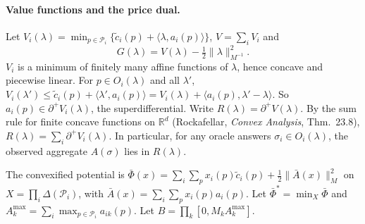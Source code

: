 \documentclass[11pt]{article}
\theoremstyle{definition}
\theoremstyle{remark}
\newcommand{\R}{\mathbb{R}}
\newcommand{\cP}{\mathcal{P}}
\newcommand{\ip}[2]{\langle #1,#2\rangle}
\newcommand{\Abar}{\bar A}
\newcommand{\Amax}{A^{\max}}
\newcommand{\sd}{\partial^{+}}
\begin{document}
\paragraph{Value functions and the price dual.} Let $V_i(\lambda)=\min_{p\in\cP_i}\{\tilde c_i(p)+\ip{\lambda}{a_i(p)}\}$, $V=\sum_iV_i$ and
\[G(\lambda)=V(\lambda)-\tfrac12\|\lambda\|^2_{M^{-1}}.\]
$V_i$ is a minimum of finitely many affine functions of $\lambda$, hence concave and piecewise linear. For $p\in O_i(\lambda)$ and all $\lambda'$, $V_i(\lambda')\le\tilde c_i(p)+\ip{\lambda'}{a_i(p)}=V_i(\lambda)+\ip{a_i(p)}{\lambda'-\lambda}$. So $a_i(p)\in\sd V_i(\lambda)$, the superdifferential. Write $R(\lambda)=\sd V(\lambda)$. By the sum rule for finite concave functions on $\R^d$ (Rockafellar, \emph{Convex Analysis}, Thm.~23.8), $R(\lambda)=\sum_i\sd V_i(\lambda)$. In particular, for any oracle answers $\sigma_i\in O_i(\lambda)$, the observed aggregate $A(\sigma)$ lies in $R(\lambda)$.

The convexified potential is $\bar\Phi(x)=\sum_i\sum_px_i(p)\tilde c_i(p)+\tfrac12\|\Abar(x)\|_M^2$ on $X=\prod_i\Delta(\cP_i)$, with $\Abar(x)=\sum_i\sum_px_i(p)a_i(p)$. Let $\bar\Phi^*=\min_X\bar\Phi$ and $\Amax_k=\sum_i\max_{p\in\cP_i}a_{ik}(p)$. Let $B=\prod_k[0,M_k\Amax_k]$.
\end{document}
